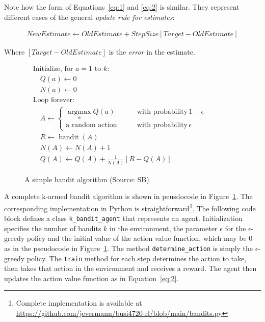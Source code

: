 Note how the form of Equations~\ref{eq:1} and \ref{eq:2} is similar. They represent different cases of the general \emph{update rule for estimates}:

\begin{align*}
NewEstimate \leftarrow OldEstimate + StepSize \left[ Target - OldEstimate \right]
\end{align*}

Where $\left[ Target - OldEstimate \right]$ is the \emph{error} in the estimate.

\begin{figure}
\begin{tcolorbox}[colback=code]
\begin{align*}
&\text{Initialize, for $a=1$ to $k$:}\\
&\quad Q(a) \leftarrow 0 \\
&\quad N(a) \leftarrow 0 \\
&\text{Loop forever:} \\
&\quad A \leftarrow \begin{cases} \operatorname*{arg max}_a Q(a) &\qquad \text{with probability}\, 1-\epsilon \\
\text{a random action} &\qquad \text{with probability} 
\, \epsilon
\end{cases} \hspace{1in} \\
&\quad R \leftarrow \operatorname{bandit}(A) \\
&\quad N(A) \leftarrow N(A) + 1 \\
&\quad Q(A) \leftarrow Q(A) + \frac{1}{N(A)} \left[ R - Q(A) \right]
\end{align*}
\end{tcolorbox}
\caption{A simple bandit algorithm (Source: SB)}
\label{fig:karmedbandit}
\end{figure}

A complete k-armed bandit algorithm is shown in peusdocode in Figure~\ref{fig:karmedbandit}. The corresponding implementation in Python is straightforward\footnote{Complete implementation is available at \url{https://github.com/jevermann/busi4720-rl/blob/main/bandits.py}}. The following code block defines a class \texttt{k\_bandit\_agent} that represents an agent. Initialization specifies the number of bandits $k$ in the environment, the parameter $\epsilon$ for the $\epsilon$-greedy policy and the initial value of the action value function, which may be 0 as in the pseudocode in Figure~\ref{fig:karmedbandit}. The method \texttt{determine\_action} is simply the $\epsilon$-greedy policy. The \texttt{train} method for each step determines the action to take, then takes that action in the environment and receives a reward. The agent then updates the action value function as in Equation~\ref{eq:2}.

